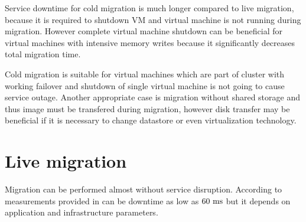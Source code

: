Service downtime for cold migration is much longer compared to live migration, because it is required to shutdown \Ac{VM} and virtual machine is not running during migration. However complete virtual machine shutdown can be beneficial for virtual machines with intensive memory writes because it significantly decreases total migration time. 

Cold migration is suitable for virtual machines which are part of cluster with working failover and shutdown of single virtual machine is not going to cause service outage. Another appropriate case is migration without shared storage and thus image must be transfered during migration, however disk transfer may be beneficial if it is necessary to change datastore or even virtualization technology.


\section{Live migration}
Migration can be performed  almost without service disruption. According to measurements provided in \cite{live-migration-of-vms} can be downtime as low as $60~\mathrm{ms}$ but it depends on application and infrastructure parameters.



